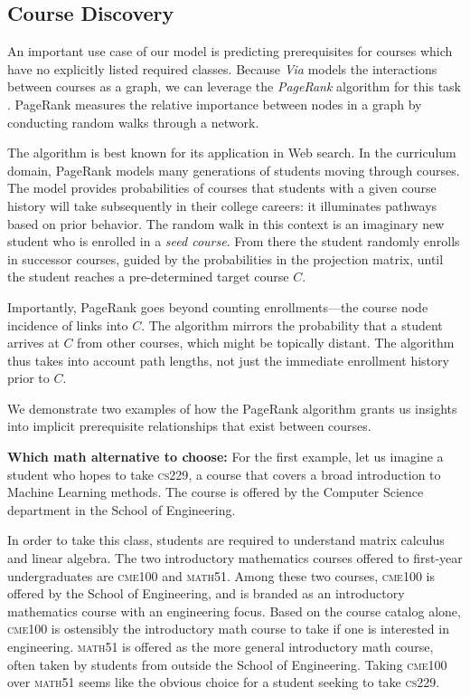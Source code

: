 \subsection{Course Discovery}
An important use case of our model is predicting prerequisites for
courses which have no explicitly listed required classes. Because {\em
  Via} models the interactions between courses as a graph, we can
leverage the {\em PageRank} algorithm for this task
\cite{Page1999}. PageRank measures the relative importance between nodes in a graph by conducting random walks through a network.

The algorithm is best known for its application in Web search. In the
curriculum domain, PageRank models many generations of students moving
through courses. The model provides probabilities of courses that
students with a given course history will take subsequently in their
college careers: it illuminates pathways based on prior
behavior. The random walk in this context is an imaginary new student
who is enrolled in a {\em seed course}. From there the student
randomly enrolls in successor courses, guided by the probabilities in
the projection matrix, until the student reaches a pre-determined
target course $C$.

Importantly, PageRank goes beyond counting enrollments---the course
node incidence of links into $C$. The algorithm mirrors the
probability that a student arrives at $C$ from other courses, which
might be topically distant. The algorithm thus takes into account path
lengths, not just the immediate enrollment history prior to $C$.

We demonstrate two examples of how the PageRank algorithm grants us
insights into implicit prerequisite relationships that exist between
courses.

{\bf Which math alternative to choose:} For the first example, let us imagine a student who hopes to take \textsc{cs229}, a course that covers a broad introduction to Machine Learning methods.  The course is offered by
the Computer Science department in the School of Engineering.

In order to take this class, students are required to understand
matrix calculus and linear algebra. The two introductory mathematics
courses offered to first-year undergraduates are \textsc{cme100} and
\textsc{math51}. Among these two courses, \textsc{cme100} is offered by the School of Engineering, and is branded as an introductory mathematics course with an engineering focus. Based on the course catalog alone, \textsc{cme100} is ostensibly the introductory math course to take if one is interested in engineering. \textsc{math51} is offered as the more general introductory math course, often taken by students from outside the School of Engineering. Taking \textsc{cme100} over \textsc{math51} seems like the obvious choice for a student seeking to take \textsc{cs229}. 


